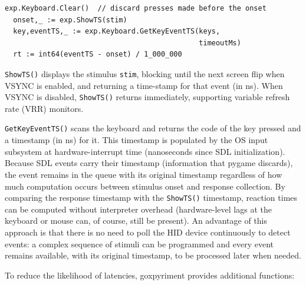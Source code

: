 \documentclass[doc,a4paper,floatsintext]{apa7}
\begin{document}
\noindent%
\begin{lstlisting}[numbers=none,basicstyle=\small]
  exp.Keyboard.Clear()  // discard presses made before the onset
  onset,_ := exp.ShowTS(stim)
  key,eventTS,_ := exp.Keyboard.GetKeyEventTS(keys,
                                              timeoutMs)
  rt := int64(eventTS - onset) / 1_000_000
\end{lstlisting}

\texttt{ShowTS()} displays the stimulus \texttt{stim}, blocking until
the next screen flip when VSYNC is enabled, and returning a
time-stamp for that event (in ns).  When VSYNC is disabled,
\texttt{ShowTS()} returns immediately, supporting variable
refresh rate (VRR) monitors.

\verb|GetKeyEventTS()| scans the keyboard and returns the code of the
key pressed and a timestamp (in ns) for it. This timestamp is
populated by the OS input subsystem at hardware-interrupt time
(nanoseconds since SDL initialization).  Because SDL events carry
their timestamp (information that pygame discards), the event remains in
the queue with its original timestamp regardless of how much
computation occurs between stimulus onset and response collection.  By
comparing the response timestamp with the \texttt{ShowTS()} timestamp,
reaction times can be computed without interpreter overhead
(hardware-level lags at the keyboard or mouse can, of course, still be
present). An advantage of this approach is that there is no need to
poll the HID device continuously to detect events: a complex sequence
of stimuli can be programmed and every event remains available, with
its original timestamp, to be processed later when needed.

To reduce the likelihood of latencies, goxpyriment provides additional functions:
\end{document}
